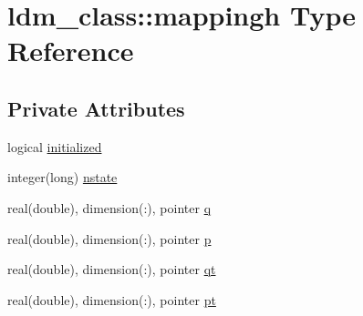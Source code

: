\hypertarget{structldm__class_1_1mappingh}{\section{ldm\+\_\+class\+:\+:mappingh Type Reference}
\label{structldm__class_1_1mappingh}
}
\subsection*{Private Attributes}
\begin{DoxyCompactItemize}
\item 
logical \hyperlink{structldm__class_1_1mappingh_af1c4c38811def9952afe0d9b22e217d1}{initialized}
\item 
integer(long) \hyperlink{structldm__class_1_1mappingh_afcacabc5c5c78955a82149ec73e61ace}{nstate}
\item 
real(double), dimension(\+:), pointer \hyperlink{structldm__class_1_1mappingh_a96362e0e8ef0f331697c4f4eb6f469f3}{q}
\item 
real(double), dimension(\+:), pointer \hyperlink{structldm__class_1_1mappingh_a4e04fac91c6ad36dcc151cd32fdcb5d6}{p}
\item 
real(double), dimension(\+:), pointer \hyperlink{structldm__class_1_1mappingh_aec5f3cec49bf4ddcdb7121004a387517}{qt}
\item 
real(double), dimension(\+:), pointer \hyperlink{structldm__class_1_1mappingh_a32e0570b54823fee3707253fd3f841d4}{pt}
\end{DoxyCompactItemize}



